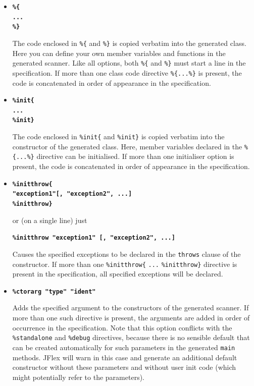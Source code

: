 \documentclass[11pt]{scrartcl}
\begin{document}
\begin{itemize}
\item
{\bf \verb+%{+}\\ {\bf \texttt{...}}\\ {\bf \verb+%}+}

The code enclosed in \verb+%{+ and \verb+%}+ is copied verbatim
into the generated class. Here you can define your own member variables
and functions in the generated scanner. Like all options, both \verb+%{+
and \verb+%}+ must start a line in the specification. If more than one
class code directive \verb+%{...%}+ is present, the code is concatenated
in order of appearance in the specification.
 
\item
{\bf \verb+%init{+}\\
{\bf \texttt{...}}\\
{\bf \verb+%init}+}

The code enclosed in \verb+%init{+ and \verb+%init}+ is copied
verbatim into the constructor of the generated class. Here, member
variables declared in the \verb+%{...%}+ directive can be initialised.
If more than one initialiser option is present, the code is concatenated
in order of appearance in the specification.
 
\item
{\bf \verb+%initthrow{+}\\
{\bf \texttt{"exception1"[, "exception2", ...]}}\\
{\bf \verb+%initthrow}+}

or (on a single line) just

{\bf \texttt{\%initthrow "exception1" [,  "exception2", ...]}}

Causes the specified exceptions to be declared in the \texttt{throws}
clause of the constructor. If more than one \verb+%initthrow{+ \texttt{...} \verb+%initthrow}+
directive is present in the specification, all specified exceptions will
be declared.

\item
{\bf \texttt{\%ctorarg "type" "ident"}}

Adds the specified argument to the constructors of the generated scanner. 
If more than one such directive is present, the arguments are added in order
of occurrence in the specification. Note that this option conflicts with
the \verb+%standalone+ and \verb+%debug+ directives, because there is no
sensible default that can be created automatically for such parameters 
in the generated \texttt{main} methods. JFlex will warn in this case and
generate an additional default constructor without these parameters and without user init code (which might potentially refer to the parameters).


\end{itemize}
\end{document}
